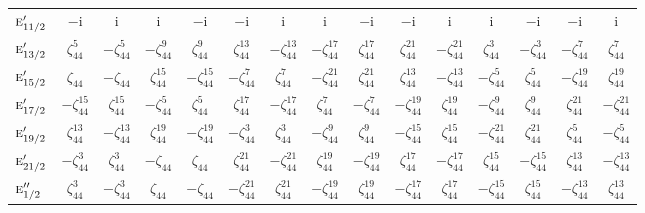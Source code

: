 \documentclass[10pt,a4paper]{article}
\numberwithin{equation}{section}
\newcommand{\irr}[1]{\text{\normalfont\scshape #1}}
\newcommand{\iunit}{\mathrm{i}}
\newcommand{\rootunity}[1]{\zeta_{#1}}
\begin{document}
{\begin{longtable}{@{}lcccccccccccccc@{}}
$\irr{e}_{11/2}'$ & $-\iunit{}$ & $\iunit{}$ & $\iunit{}$ & $-\iunit{}$ & $-\iunit{}$ & $\iunit{}$ & $\iunit{}$ & $-\iunit{}$ & $-\iunit{}$ & $\iunit{}$ & $\iunit{}$ & $-\iunit{}$ & $-\iunit{}$ & $\iunit{}$\\
$\irr{e}_{13/2}'$ & $\rootunity{44}^{5}$ & $-\rootunity{44}^{5}$ & $-\rootunity{44}^{9}$ & $\rootunity{44}^{9}$ & $\rootunity{44}^{13}$ & $-\rootunity{44}^{13}$ & $-\rootunity{44}^{17}$ & $\rootunity{44}^{17}$ & $\rootunity{44}^{21}$ & $-\rootunity{44}^{21}$ & $\rootunity{44}^{3}$ & $-\rootunity{44}^{3}$ & $-\rootunity{44}^{7}$ & $\rootunity{44}^{7}$\\
$\irr{e}_{15/2}'$ & $\rootunity{44}$ & $-\rootunity{44}$ & $\rootunity{44}^{15}$ & $-\rootunity{44}^{15}$ & $-\rootunity{44}^{7}$ & $\rootunity{44}^{7}$ & $-\rootunity{44}^{21}$ & $\rootunity{44}^{21}$ & $\rootunity{44}^{13}$ & $-\rootunity{44}^{13}$ & $-\rootunity{44}^{5}$ & $\rootunity{44}^{5}$ & $-\rootunity{44}^{19}$ & $\rootunity{44}^{19}$\\
$\irr{e}_{17/2}'$ & $-\rootunity{44}^{15}$ & $\rootunity{44}^{15}$ & $-\rootunity{44}^{5}$ & $\rootunity{44}^{5}$ & $\rootunity{44}^{17}$ & $-\rootunity{44}^{17}$ & $\rootunity{44}^{7}$ & $-\rootunity{44}^{7}$ & $-\rootunity{44}^{19}$ & $\rootunity{44}^{19}$ & $-\rootunity{44}^{9}$ & $\rootunity{44}^{9}$ & $\rootunity{44}^{21}$ & $-\rootunity{44}^{21}$\\
$\irr{e}_{19/2}'$ & $\rootunity{44}^{13}$ & $-\rootunity{44}^{13}$ & $\rootunity{44}^{19}$ & $-\rootunity{44}^{19}$ & $-\rootunity{44}^{3}$ & $\rootunity{44}^{3}$ & $-\rootunity{44}^{9}$ & $\rootunity{44}^{9}$ & $-\rootunity{44}^{15}$ & $\rootunity{44}^{15}$ & $-\rootunity{44}^{21}$ & $\rootunity{44}^{21}$ & $\rootunity{44}^{5}$ & $-\rootunity{44}^{5}$\\
$\irr{e}_{21/2}'$ & $-\rootunity{44}^{3}$ & $\rootunity{44}^{3}$ & $-\rootunity{44}$ & $\rootunity{44}$ & $\rootunity{44}^{21}$ & $-\rootunity{44}^{21}$ & $\rootunity{44}^{19}$ & $-\rootunity{44}^{19}$ & $\rootunity{44}^{17}$ & $-\rootunity{44}^{17}$ & $\rootunity{44}^{15}$ & $-\rootunity{44}^{15}$ & $\rootunity{44}^{13}$ & $-\rootunity{44}^{13}$\\
$\irr{e}_{1/2}''$ & $\rootunity{44}^{3}$ & $-\rootunity{44}^{3}$ & $\rootunity{44}$ & $-\rootunity{44}$ & $-\rootunity{44}^{21}$ & $\rootunity{44}^{21}$ & $-\rootunity{44}^{19}$ & $\rootunity{44}^{19}$ & $-\rootunity{44}^{17}$ & $\rootunity{44}^{17}$ & $-\rootunity{44}^{15}$ & $\rootunity{44}^{15}$ & $-\rootunity{44}^{13}$ & $\rootunity{44}^{13}$\\

\end{longtable}}
\end{document}
